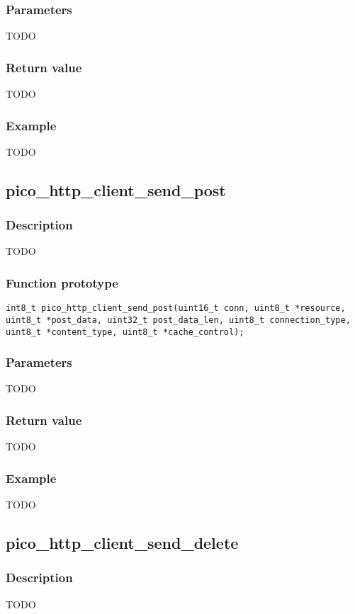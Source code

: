 \subsubsection*{Parameters}
TODO
\subsubsection*{Return value}
TODO
\subsubsection*{Example}
TODO


\subsection{pico\_http\_client\_send\_post}

\subsubsection*{Description}
TODO

\subsubsection*{Function prototype}
\texttt{int8\_t pico\_http\_client\_send\_post(uint16\_t conn, uint8\_t *resource, uint8\_t *post\_data, uint32\_t post\_data\_len, uint8\_t connection\_type, uint8\_t *content\_type, uint8\_t *cache\_control);}

\subsubsection*{Parameters}
TODO
\subsubsection*{Return value}
TODO
\subsubsection*{Example}
TODO


\subsection{pico\_http\_client\_send\_delete}

\subsubsection*{Description}
TODO

